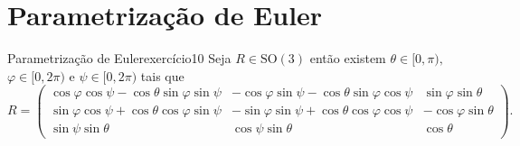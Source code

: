 \section{Parametrização de Euler}
\begin{proposition}{Parametrização de Euler}{exercício10}
    Seja \(R \in \mathrm{SO}(3)\) então existem \(\theta \in [0,\pi),\) \(\varphi \in [0,2\pi)\) e \(\psi \in [0,2\pi)\) tais que
    \begin{equation*}
        R = \begin{pmatrix}
            \cos\varphi \cos\psi - \cos\theta\sin\varphi\sin\psi & - \cos\varphi\sin\psi - \cos\theta \sin\varphi\cos\psi & \sin\varphi \sin\theta\\
            \sin\varphi \cos\psi + \cos\theta \cos\varphi \sin\psi &-\sin\varphi\sin\psi + \cos\theta \cos\varphi \cos\psi & - \cos\varphi \sin\theta\\
            \sin\psi \sin\theta & \cos\psi\sin\theta & \cos\theta
        \end{pmatrix}.
    \end{equation*}
\end{proposition}

